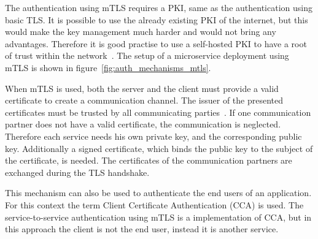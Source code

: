 The authentication using mTLS requires a PKI, same as the authentication using basic TLS.
It is possible to use the already existing PKI of the internet, but this would make the key management much harder and would not bring any advantages.
Therefore it is good practise to use a self-hosted PKI to have a root of trust within the network~\cite{dias2020microservices}.
The setup of a microservice deployment using mTLS is shown in figure~\ref{fig:auth_mechanisms_mtls}.

When mTLS is used, both the server and the client must provide a valid certificate to create a communication channel.
The issuer of the presented certificates must be trusted by all communicating parties~\cite{dias2020microservices}.
If one communication partner does not have a valid certificate, the communication is neglected.
Therefore each service needs his own private key, and the corresponding public key.
Additionally a signed certificate, which binds the public key to the subject of the certificate, is needed.
The certificates of the communication partners are exchanged during the TLS handshake.

This mechanism can also be used to authenticate the end users of an application.
For this context the term Client Certificate Authentication (CCA) is used.
The service-to-service authentication using mTLS is a implementation of CCA, but in this approach the client is not the end user, instead it is another service.

